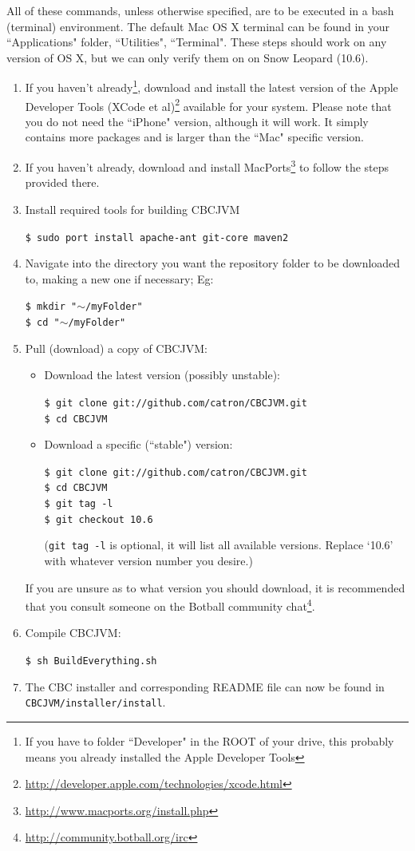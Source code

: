 \documentclass[12pt,letterpaper]{article}
\newcommand{\urlfootnote}[1]{\footnote{\url{#1}}}
\newcommand{\code}[1]{\par\texttt{#1}\par}
\begin{document}
All of these commands, unless otherwise specified, are to be executed in a bash (terminal) environment. The default Mac OS X terminal can be found in your ``Applications" folder, ``Utilities", ``Terminal". These steps should work on any version of OS X, but we can only verify them on on Snow Leopard (10.6).
\begin{enumerate}
\item If you haven't already\footnote{If you have to folder ``Developer" in the ROOT of your drive, this probably means you already installed the Apple Developer Tools}, download and install the latest version of the Apple Developer Tools (XCode et al)\urlfootnote{http://developer.apple.com/technologies/xcode.html} available for your system. Please note that you do not need the ``iPhone" version, although it will work. It simply contains more packages and is larger than the ``Mac" specific version.
\item If you haven't already, download and install MacPorts\urlfootnote{http://www.macports.org/install.php} to follow the steps provided there.
\item Install required tools for building CBCJVM
      \code{\$ sudo port install apache-ant git-core maven2}
\item Navigate into the directory you want the repository folder to be downloaded to, making a new one if necessary; Eg:
      \code{\$ mkdir "$\mathtt{\sim}$/myFolder"\\
            \$ cd "$\mathtt{\sim}$/myFolder"}
\item Pull (download) a copy of CBCJVM:\par
      \begin{itemize}
          \item Download the latest version (possibly unstable):
                \code{\$ git clone git://github.com/catron/CBCJVM.git \\
                      \$ cd CBCJVM}
          \item Download a specific (``stable") version:
                \code{\$ git clone git://github.com/catron/CBCJVM.git \\
                      \$ cd CBCJVM \\
                      \$ git tag -l \\
                      \$ git checkout 10.6}
                (\texttt{git tag -l} is optional, it will list all available versions. Replace `10.6' with whatever version number you desire.)
      \end{itemize}
      If you are unsure as to what version you should download, it is recommended that you consult someone on the Botball community chat\urlfootnote{http://community.botball.org/irc}.
\item Compile CBCJVM:
      \code{\$ sh BuildEverything.sh}
\item The CBC installer and corresponding README file can now be found in \texttt{CBCJVM/\-installer/\-install}.
\end{enumerate}
\end{document}
